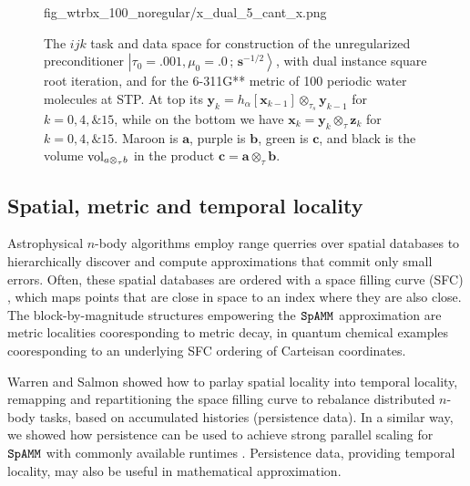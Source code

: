 \documentclass[letterpaper,twocolumn,amsmath,amsfont,amssymb,english,aps,jcp,preprintnumbers,groupaddress,nofootinbib,tightenlines,floatfix]{revtex4}
\newcommand{\mat}[1]{\boldsymbol{#1}}
\newcommand{\ot}{  {\scriptstyle \otimes}_{ \tau } }
\newcommand{\ots}{ {\scriptstyle \otimes}_{ \! \tau_s } }
\theoremstyle{plain}
\theoremstyle{remark}
\theoremstyle{plain}
\begin{document}
\begin{figure}[h]
{                        {fig_wtrbx_100_noregular/x_dual_5_cant_x.png}} 
\caption{
The $ijk$ task and data space for construction of the unregularized preconditioner 
$\left|\tau_0=.001,\mu_0=.0\, ; \,\scriptstyle{\mat{s}^{-1/2}} \right>$, with
dual instance square root iteration, and for the 6-311G** metric of 100 periodic water molecules
at STP.  At top its  $\mat{y}_k=h_\alpha[ \mat{x}_{k-1} ] \ots \mat{y}_{k-1}$
for $k=0,4,\& 15$, while on the bottom we have $\mat{x}_k=  \mat{y}_{k}  \ot \mat{z}_{k}$ for $k=0,4, \& 15$.
Maroon is $\mat{a}$, purple is $\mat{b}$, green is $\mat{c}$,  and black is the volume ${\rm vol}_{a \ot b}$
in the product $\mat{c}=\mat{a} \ot \mat{b}$.}\label{Lensing3}
\end{figure}

\subsection{Spatial, metric  and temporal locality}

Astrophysical $n$-body algorithms employ range querries over spatial databases to hierarchically discover 
and compute approximations that commit only small errors.  Often, these spatial databases are ordered with a 
space filling curve (SFC) \cite{}, which maps points that are close in space to an index where they are also close. 
The block-by-magnitude structures empowering the $\tt SpAMM$ approximation are metric localities cooresponding
to metric decay, in quantum chemical examples cooresponding to an underlying SFC ordering of Carteisan coordinates. 

Warren and Salmon showed how to parlay spatial locality into temporal locality, 
remapping and repartitioning the space filling curve to rebalance distributed $n$-body tasks,
based on accumulated histories (persistence data).
In a similar way, we showed how persistence can be used to achieve 
strong parallel scaling for $\tt SpAMM$ with commonly available runtimes \cite{}.  
Persistence data, providing temporal locality, may also be useful in mathematical approximation.  
\end{document}
